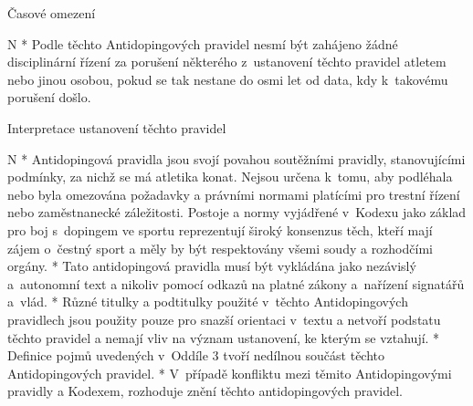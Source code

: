 \secc Časové omezení

\begitems \style N
* Podle těchto Antidopingových pravidel nesmí být zahájeno žádné disciplinární řízení za porušení některého z~ustanovení těchto pravidel atletem nebo jinou osobou, pokud se tak nestane do osmi let od data, kdy k~takovému porušení došlo.
\enditems

\secc Interpretace ustanovení těchto pravidel

\begitems \style N
* Antidopingová pravidla jsou svojí povahou soutěžními pravidly, stanovujícími podmínky, za nichž se má atletika konat. Nejsou určena k~tomu, aby podléhala nebo byla omezována požadavky a právními normami platícími pro trestní řízení nebo zaměstnanecké záležitosti. Postoje a normy vyjádřené v~Kodexu jako základ pro boj s~dopingem ve sportu reprezentují široký konsenzus těch, kteří mají zájem o~čestný sport a měly by být respektovány všemi soudy a rozhodčími orgány.
* Tato antidopingová pravidla musí být vykládána jako nezávislý a~autonomní text a nikoliv pomocí odkazů na platné zákony a~nařízení signatářů a~vlád.
* Různé titulky a podtitulky použité v~těchto Antidopingových pravidlech jsou použity pouze pro snazší orientaci v~textu a netvoří podstatu těchto pravidel a nemají vliv na význam ustanovení, ke kterým se vztahují.
* Definice pojmů uvedených v~Oddíle 3 tvoří nedílnou součást těchto Antidopingových pravidel.
* V~případě konfliktu mezi těmito Antidopingovými pravidly a Kodexem, rozhoduje znění těchto antidopingových pravidel.
\enditems

\endinput